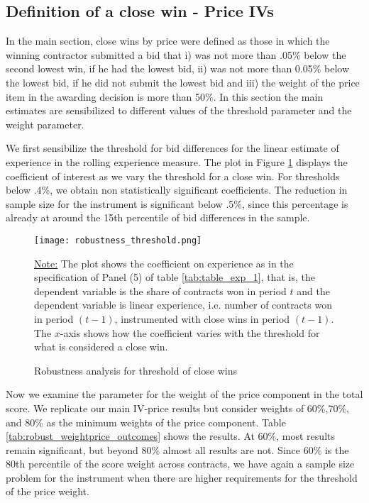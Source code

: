 \subsection{Definition of a close win - Price IVs}
In the main section, close wins by price were defined as those in which the winning contractor submitted a bid that i) was not more than .05\% below the second lowest win, if he had the lowest bid, ii) was not more than 0.05\% below the lowest bid, if he did not submit the lowest bid and iii) the weight of the price item in the awarding decision is more than 50\%. In this section the main estimates are sensibilized to different values of the threshold parameter and the weight parameter.

We first sensibilize the threshold for bid differences for the linear estimate of experience in the rolling experience measure. The plot in Figure \ref{fig:close_wins_robust} displays the coefficient of interest as we vary the threshold for a close win.  For thresholds below .4\%, we obtain non statistically significant coefficients. The reduction in sample size for the instrument is significant below .5\%, since this percentage is already at around the 15th percentile of bid differences in the sample.

 \begin{figure}[H]
         \centering
         \texttt{[image: robustness\_threshold.png]}
         \caption{Robustness analysis for threshold of close wins}
         \label{fig:close_wins_robust}

  \vskip 0.5mm
  {\justifying\footnotesize\underline{Note:} The plot shows the coefficient on experience as in the specification of Panel (5) of table \ref{tab:table_exp_1}, that is, the dependent variable is the share of contracts won in period $t$ and the dependent variable is linear experience, i.e. number of contracts won in period $(t-1)$, instrumented with close wins in period $(t-1)$. The $x$-axis shows how the coefficient varies with the threshold for what is considered a close win.\par}
 \end{figure}

Now we examine the parameter for the weight of the price component in the total score. We replicate our main IV-price results but consider weights  of 60\%,70\%, and 80\% as the minimum weights of the price component. Table \ref{tab:robust_weightprice_outcomes} shows the results. At 60\%, most results remain significant, but beyond 80\% almost all results are not. Since 60\% is the 80th percentile of the score weight across contracts, we have again a sample size problem for the instrument when there are higher requirements for the threshold of the price weight.


